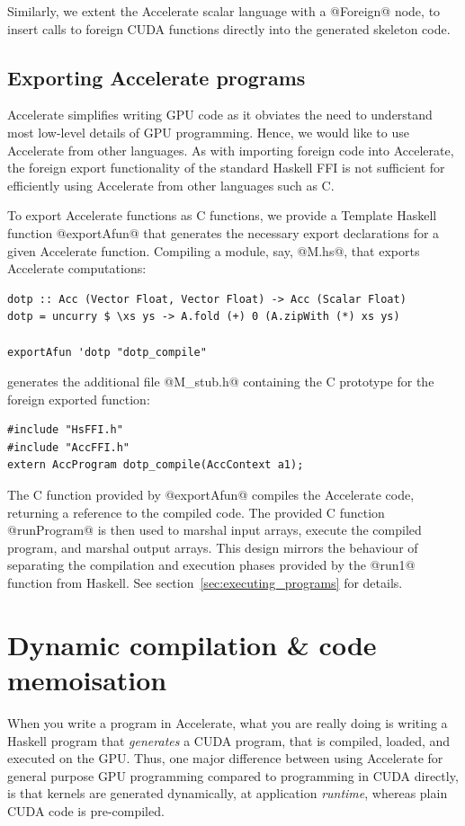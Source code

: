 Similarly, we extent the Accelerate scalar language with a @Foreign@ node, to
insert calls to foreign CUDA functions directly into the generated skeleton
code.


\subsection{Exporting Accelerate programs}

Accelerate simplifies writing GPU code as it obviates the need to understand
most low-level details of GPU programming. Hence, we would like to use
Accelerate from other languages. As with importing foreign code into Accelerate,
the foreign export functionality of the standard Haskell FFI is not sufficient
for efficiently using Accelerate from other languages such as C.

To export Accelerate functions as C functions, we provide a Template
Haskell~\cite{Sheard:2002wu} function @exportAfun@ that generates the necessary
export declarations for a given Accelerate function. Compiling a module, say,
@M.hs@, that exports Accelerate computations:
%
\begin{lstlisting}[style=haskell]
dotp :: Acc (Vector Float, Vector Float) -> Acc (Scalar Float)
dotp = uncurry $ \xs ys -> A.fold (+) 0 (A.zipWith (*) xs ys)

exportAfun 'dotp "dotp_compile"
\end{lstlisting}
%
generates the additional file @M_stub.h@ containing the C prototype for the
foreign exported function:
%
\begin{lstlisting}[style=cuda]
#include "HsFFI.h"
#include "AccFFI.h"
extern AccProgram dotp_compile(AccContext a1);
\end{lstlisting}
%
The C function provided by @exportAfun@ compiles the Accelerate code, returning
a reference to the compiled code. The provided C function @runProgram@ is then
used to marshal input arrays, execute the compiled program, and marshal output
arrays. This design mirrors the behaviour of separating the compilation and
execution phases provided by the @run1@ function from Haskell. See
section~\ref{sec:executing_programs} for details.


\section{Dynamic compilation \& code memoisation}
\label{sec:dynamic_compilation}

When you write a program in Accelerate, what you are really doing is writing a
Haskell program that \emph{generates} a CUDA program, that is compiled,
loaded, and executed on the GPU\@. Thus, one major difference between using
Accelerate for general purpose GPU programming compared to programming in
CUDA directly, is that kernels are generated dynamically, at application
\emph{runtime}, whereas plain CUDA code is pre-compiled.

